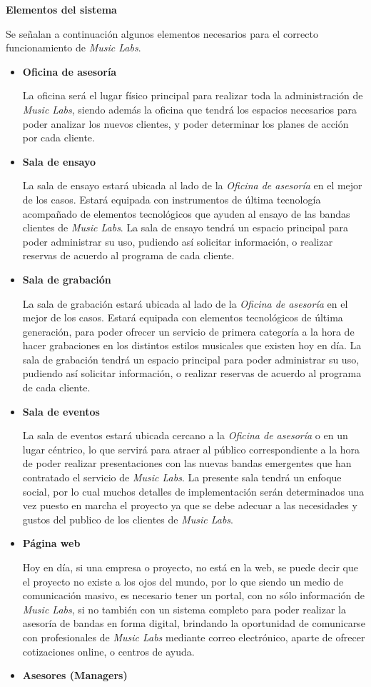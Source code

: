 { \bf Elementos del sistema}

Se señalan a continuación algunos elementos necesarios
para el correcto funcionamiento de \emph{Music Labs}.

\begin{itemize}
	\item \textbf{Oficina de asesoría}

		La oficina será el lugar físico principal para realizar toda la administración
		de \emph{Music Labs}, siendo además la oficina que tendrá los espacios necesarios
		para poder analizar los nuevos clientes, y poder determinar los planes de acción
		por cada cliente.
	\item \textbf{Sala de ensayo}

		La sala de ensayo estará ubicada al lado de la \emph{Oficina de asesoría}
		en el mejor de los casos. Estará equipada con instrumentos de última tecnología
		acompañado de elementos tecnológicos que ayuden al ensayo de las bandas
		clientes de \emph{Music Labs}.
		La sala de ensayo tendrá un espacio principal para poder administrar su uso,
		pudiendo así solicitar información, o realizar reservas de acuerdo al programa
		de cada cliente.
	\item \textbf{Sala de grabación}

		La sala de grabación estará ubicada al lado de la \emph{Oficina de asesoría}
		en el mejor de los casos. Estará equipada con elementos tecnológicos de última
		generación, para poder ofrecer un servicio de primera categoría a la hora
		de hacer grabaciones en los distintos estilos musicales que existen hoy en día.
		La sala de grabación tendrá un espacio principal para poder administrar su uso,
		pudiendo así solicitar información, o realizar reservas de acuerdo al programa
		de cada cliente.
	\item \textbf{Sala de eventos}

		La sala de eventos estará ubicada cercano  a la \emph{Oficina de asesoría}
		o en un lugar céntrico, lo que servirá para atraer al público correspondiente
		a la hora de poder realizar presentaciones con las nuevas bandas emergentes
		que han contratado el servicio de \emph{Music Labs}.
		La presente sala tendrá un enfoque social, por lo cual muchos detalles
		de implementación serán determinados una vez puesto en marcha el proyecto
		ya que se debe adecuar a las necesidades y gustos del publico de los clientes
		de \emph{Music Labs}.
	\item \textbf{Página web}

		Hoy en día, si una empresa o proyecto, no está en la web, se puede decir
		que el proyecto no existe a los ojos del mundo, por lo que siendo un medio
		de comunicación masivo, es necesario tener un portal, con no sólo información
		de \emph{Music Labs}, si no también con un sistema completo para poder
		realizar la asesoría de bandas en forma digital, brindando la oportunidad
		de comunicarse con profesionales de \emph{Music Labs} mediante correo
		electrónico, aparte de ofrecer cotizaciones online, o centros de ayuda.
	\item \textbf{Asesores (Managers)}


\end{itemize}
